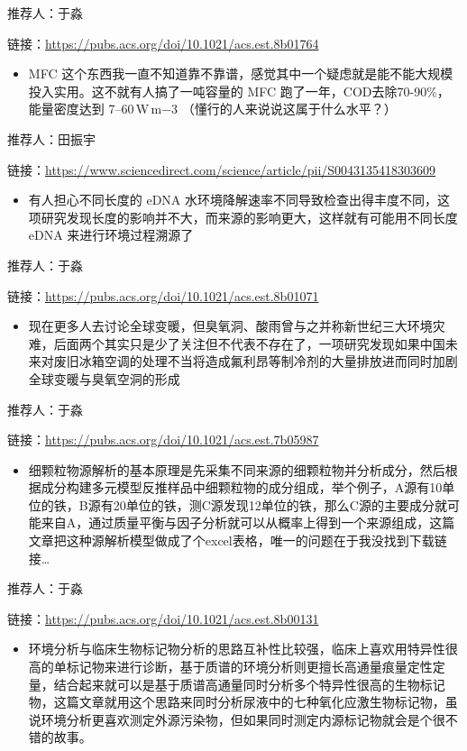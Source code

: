 \documentclass[
]{book}
\providecommand{\tightlist}{%
  \setlength{\itemsep}{0pt}\setlength{\parskip}{0pt}}
\begin{document}
推荐人：于淼

链接：\url{https://pubs.acs.org/doi/10.1021/acs.est.8b01764}

\begin{itemize}
\tightlist
\item
  MFC 这个东西我一直不知道靠不靠谱，感觉其中一个疑虑就是能不能大规模投入实用。这不就有人搞了一吨容量的 MFC 跑了一年，COD去除70-90\%，能量密度达到 7--60\,W\,m−3 （懂行的人来说说这属于什么水平？）
\end{itemize}

推荐人：田振宇

链接：\url{https://www.sciencedirect.com/science/article/pii/S0043135418303609}

\begin{itemize}
\tightlist
\item
  有人担心不同长度的 eDNA 水环境降解速率不同导致检查出得丰度不同，这项研究发现长度的影响并不大，而来源的影响更大，这样就有可能用不同长度 eDNA 来进行环境过程溯源了
\end{itemize}

推荐人：于淼

链接：\url{https://pubs.acs.org/doi/10.1021/acs.est.8b01071}

\begin{itemize}
\tightlist
\item
  现在更多人去讨论全球变暖，但臭氧洞、酸雨曾与之并称新世纪三大环境灾难，后面两个其实只是少了关注但不代表不存在了，一项研究发现如果中国未来对废旧冰箱空调的处理不当将造成氟利昂等制冷剂的大量排放进而同时加剧全球变暖与臭氧空洞的形成
\end{itemize}

推荐人：于淼

链接：\url{https://pubs.acs.org/doi/10.1021/acs.est.7b05987}

\begin{itemize}
\tightlist
\item
  细颗粒物源解析的基本原理是先采集不同来源的细颗粒物并分析成分，然后根据成分构建多元模型反推样品中细颗粒物的成分组成，举个例子，A源有10单位的铁，B源有20单位的铁，测C源发现12单位的铁，那么C源的主要成分就可能来自A，通过质量平衡与因子分析就可以从概率上得到一个来源组成，这篇文章把这种源解析模型做成了个excel表格，唯一的问题在于我没找到下载链接\ldots{}
\end{itemize}

推荐人：于淼

链接：\url{https://pubs.acs.org/doi/10.1021/acs.est.8b00131}

\begin{itemize}
\tightlist
\item
  环境分析与临床生物标记物分析的思路互补性比较强，临床上喜欢用特异性很高的单标记物来进行诊断，基于质谱的环境分析则更擅长高通量痕量定性定量，结合起来就可以是基于质谱高通量同时分析多个特异性很高的生物标记物，这篇文章就用这个思路来同时分析尿液中的七种氧化应激生物标记物，虽说环境分析更喜欢测定外源污染物，但如果同时测定内源标记物就会是个很不错的故事。
\end{itemize}
\end{document}
